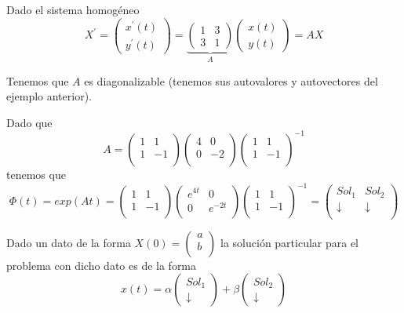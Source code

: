 \begin{example}[(Método II)]
Dado el sistema homogéneo $$X^\prime = \begin{pmatrix}
x^\prime(t)\\y^\prime(t)
\end{pmatrix}
= \underbrace{\begin{pmatrix}
1 & 3\\3 & 1
\end{pmatrix}}_{A}\begin{pmatrix}
x(t)\\y(t)
\end{pmatrix} = AX$$

Tenemos que $A$ es diagonalizable (tenemos sus autovalores y autovectores del ejemplo anterior).

Dado que $$A = \begin{pmatrix}
1& 1\\1 & -1\\
\end{pmatrix}\begin{pmatrix}
4& 0\\0& -2\\
\end{pmatrix}\begin{pmatrix}
1& 1\\1 & -1\\
\end{pmatrix}^{-1}$$
tenemos que $$\Phi(t) = exp(At) = \begin{pmatrix}
1& 1\\1 & -1\\
\end{pmatrix}\begin{pmatrix}
e^{4t}& 0\\0& e^{-2t}\\
\end{pmatrix}\begin{pmatrix}
1& 1\\1 & -1\\
\end{pmatrix}^{-1} = \begin{pmatrix}

Sol_1 & Sol_2\\ \downarrow & \downarrow\\
\end{pmatrix}$$

Dado un dato de la forma $X(0) = \begin{pmatrix}
a\\b\\
\end{pmatrix}$ la solución particular para el problema con dicho dato es de la forma $$x(t) = \alpha\begin{pmatrix}
Sol_1\\\downarrow
\end{pmatrix} + \beta\begin{pmatrix}
Sol_2\\\downarrow
\end{pmatrix}$$


\end{example}
